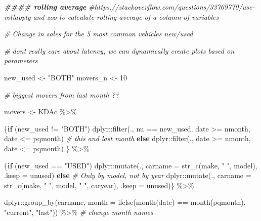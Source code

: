 \documentclass[
]{article}
\newenvironment{Shaded}{\begin{snugshade}}{\end{snugshade}}
\newcommand{\AttributeTok}[1]{\textcolor[rgb]{0.77,0.63,0.00}{#1}}
\newcommand{\CommentTok}[1]{\textcolor[rgb]{0.56,0.35,0.01}{\textit{#1}}}
\newcommand{\ControlFlowTok}[1]{\textcolor[rgb]{0.13,0.29,0.53}{\textbf{#1}}}
\newcommand{\DecValTok}[1]{\textcolor[rgb]{0.00,0.00,0.81}{#1}}
\newcommand{\DocumentationTok}[1]{\textcolor[rgb]{0.56,0.35,0.01}{\textbf{\textit{#1}}}}
\newcommand{\FunctionTok}[1]{\textcolor[rgb]{0.00,0.00,0.00}{#1}}
\newcommand{\NormalTok}[1]{#1}
\newcommand{\OtherTok}[1]{\textcolor[rgb]{0.56,0.35,0.01}{#1}}
\newcommand{\SpecialCharTok}[1]{\textcolor[rgb]{0.00,0.00,0.00}{#1}}
\newcommand{\StringTok}[1]{\textcolor[rgb]{0.31,0.60,0.02}{#1}}
\begin{document}
\begin{Shaded}
\begin{Highlighting}[]
\DocumentationTok{\#\#\#\# rolling average}
\CommentTok{\#https://stackoverflow.com/questions/33769770/use{-}rollapply{-}and{-}zoo{-}to{-}calculate{-}rolling{-}average{-}of{-}a{-}column{-}of{-}variables}

\CommentTok{\# Change in sales for the 5 most common vehicles new/used}

\CommentTok{\# don\textquotesingle{}t really care about latency, we can dynamically create plots based on parameters}

\NormalTok{new\_used }\OtherTok{\textless{}{-}} \StringTok{"BOTH"}
\NormalTok{movers\_n }\OtherTok{\textless{}{-}} \DecValTok{10}

\CommentTok{\# biggest movers from last month ??}

\NormalTok{movers }\OtherTok{\textless{}{-}}\NormalTok{ KDAc }\SpecialCharTok{\%\textgreater{}\%}
  
\NormalTok{  \{}\ControlFlowTok{if}\NormalTok{ (new\_used }\SpecialCharTok{!=} \StringTok{"BOTH"}\NormalTok{)}
\NormalTok{    dplyr}\SpecialCharTok{::}\FunctionTok{filter}\NormalTok{(., nu }\SpecialCharTok{==}\NormalTok{ new\_used, date }\SpecialCharTok{\textgreater{}=}\NormalTok{ nmonth, date }\SpecialCharTok{\textless{}=}\NormalTok{ pqmonth) }\CommentTok{\# this and last month}
    \ControlFlowTok{else} 
\NormalTok{      dplyr}\SpecialCharTok{::}\FunctionTok{filter}\NormalTok{(., date }\SpecialCharTok{\textgreater{}=}\NormalTok{ nmonth, date }\SpecialCharTok{\textless{}=}\NormalTok{ pqmonth)}
\NormalTok{  \} }\SpecialCharTok{\%\textgreater{}\%}
  
\NormalTok{  \{}\ControlFlowTok{if}\NormalTok{ (new\_used }\SpecialCharTok{==} \StringTok{"USED"}\NormalTok{) }
\NormalTok{    dplyr}\SpecialCharTok{::}\FunctionTok{mutate}\NormalTok{(., }\AttributeTok{carname =} \FunctionTok{str\_c}\NormalTok{(make, }\StringTok{" "}\NormalTok{, model), }\AttributeTok{.keep =} \StringTok{\textquotesingle{}unused\textquotesingle{}}\NormalTok{)}
    \ControlFlowTok{else} \CommentTok{\# Only by model, not by year}
\NormalTok{      dplyr}\SpecialCharTok{::}\FunctionTok{mutate}\NormalTok{(., }\AttributeTok{carname =} \FunctionTok{str\_c}\NormalTok{(make, }\StringTok{" "}\NormalTok{, model, }\StringTok{" "}\NormalTok{, caryear), }\AttributeTok{.keep =} \StringTok{\textquotesingle{}unused\textquotesingle{}}\NormalTok{)\} }\SpecialCharTok{\%\textgreater{}\%}
  
\NormalTok{  dplyr}\SpecialCharTok{::}\FunctionTok{group\_by}\NormalTok{(carname, }\AttributeTok{month =} \FunctionTok{ifelse}\NormalTok{(}\FunctionTok{month}\NormalTok{(date) }\SpecialCharTok{==} \FunctionTok{month}\NormalTok{(pqmonth), }\StringTok{"current"}\NormalTok{, }\StringTok{"last"}\NormalTok{)) }\SpecialCharTok{\%\textgreater{}\%} \CommentTok{\# change month names}
  

\end{Highlighting}
\end{Shaded}
\end{document}
